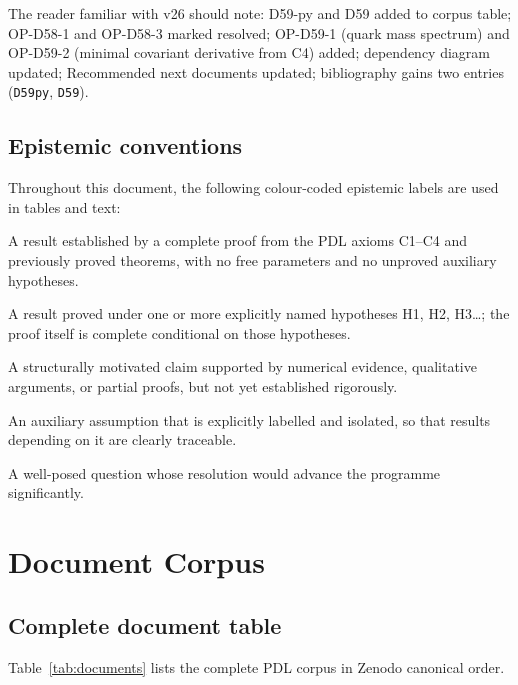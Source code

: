 \documentclass[11pt,a4paper]{article}
\theoremstyle{plain}
\theoremstyle{definition}
\theoremstyle{remark}
\begin{document}
The reader familiar with v26 should note: D59-py and D59 added to corpus table; OP-D58-1 and OP-D58-3 marked resolved; OP-D59-1 (quark mass spectrum) and OP-D59-2 (minimal covariant derivative from C4) added; dependency diagram updated; Recommended next documents updated; bibliography gains two entries (\texttt{D59py}, \texttt{D59}).

\subsection{Epistemic conventions}
\label{subsec:conventions}
Throughout this document, the following colour-coded epistemic labels are used in tables and text:
\begin{description}[leftmargin=2.5cm, style=nextline]
\item[\textcolor{proofblue}{Theorem}] A result established by a complete proof from the PDL axioms C1--C4 and previously proved theorems, with no free parameters and no unproved auxiliary hypotheses.
\item[\textcolor{proofblue}{Theorem (H$x$)}] A result proved under one or more explicitly named hypotheses H1, H2, H3\ldots; the proof itself is complete conditional on those hypotheses.
\item[\textcolor{conjecturegreen}{Conjecture}] A structurally motivated claim supported by numerical evidence, qualitative arguments, or partial proofs, but not yet established rigorously.
\item[\textcolor{hypothesisorange}{Named Hypothesis}] An auxiliary assumption that is explicitly labelled and isolated, so that results depending on it are clearly traceable.
\item[\textcolor{openproblemred}{Open Problem}] A well-posed question whose resolution would advance the programme significantly.
\end{description}

\section{Document Corpus}
\label{sec:corpus}

\subsection{Complete document table}
\label{subsec:doctable}
Table~\ref{tab:documents} lists the complete PDL corpus in Zenodo canonical order.
\end{document}
